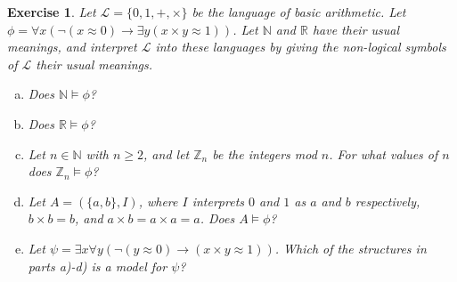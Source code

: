 \documentclass{article}
\theoremstyle{plain}
\newtheorem{Q}[theorem]{Exercise}{\bfseries}{\upshape}
\newcommand{\sL}{\mathscr{L}}
\newcommand{\bN}{\mathbb{N}}
\newcommand{\bZ}{\mathbb{Z}}
\newcommand{\bR}{\mathbb{R}}
\begin{document}
\begin{Q}
Let $\sL=\{0,1,+,\times\}$ be the language of basic arithmetic. Let $\phi=\forall x(\neg(x\approx 0)\rightarrow \exists y(x\times y \approx 1))$. Let $\bN$ and $\bR$ have their usual meanings, and interpret $\sL$ into these languages by giving the non-logical symbols of $\sL$ their usual meanings. 
\begin{enumerate}[a)]
\item Does $\bN\models \phi$?
\item Does $\bR\models \phi$?
\item Let $n\in\bN$ with $n\geq 2$, and let $\bZ_n$ be the integers mod $n$. For what values of $n$ does $\bZ_n\models \phi$? 
\item Let $A=(\{a,b\},I)$, where $I$ interprets $0$ and $1$ as $a$ and $b$ respectively, $b\times b = b$, and $a\times b = a\times a = a$. Does $A\models \phi$?
\item Let $\psi= \exists x \forall y(\neg (y\approx 0)\rightarrow (x\times y \approx 1))$. Which of the structures in parts a)-d) is a model for $\psi$? 
\end{enumerate} 
\end{Q}
\begin{comment}
\textbf{Solution:}
\begin{enumerate}[a)]
\item $\bN$ does not satisfy $\phi$. For example, there is no natural number $n$ such that $2\times n \approx 1$.
\item $\bR$ satisfies $\phi$, because every non-zero real number $x$ has a multiplicative inverse $\frac{1}{x}$.
\item Proposition \ref{P:inv} from the number theory notes gives the answer to this. According to this, $a$ has a multiplicative inverse mod $n$ if and only if $a$ and $n$ are coprime. In order for every non-zero member of $\bZ_n$ to have an multiplicative inverse it is necessary and sufficient for $n$ to be prime.
\item In $A$ there is only one non-zero element, and that is $b$, which corresponds to $1$. Since we are told that $b\times b = b$, it follows that $A\models \phi$.  
\item $\psi$ says that there is an element $x$ such that whenever $y$ is a non-zero element we have $x\times y = 1$. This is obviously not true in $\bN$ or $\bR$. It is true for $\bZ_2$, and also for $A$.
\end{enumerate}
\end{comment}
\end{document}
